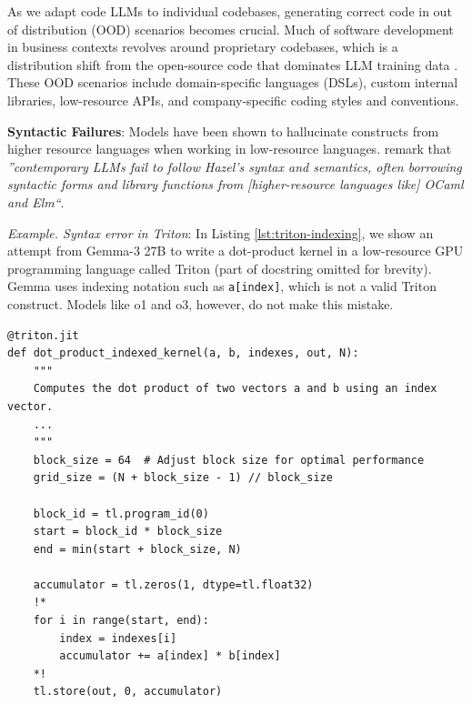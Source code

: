 
As we adapt code LLMs to individual codebases, generating correct code in out of distribution (OOD) scenarios becomes crucial. Much of software development in business contexts revolves around proprietary codebases, which is a distribution shift from the open-source code that dominates LLM training data  \citep{ahmed2024studying}. These OOD scenarios include domain-specific languages (DSLs), custom internal libraries, low-resource APIs, and company-specific coding styles and conventions.

\textbf{Syntactic Failures}: Models have been shown to hallucinate constructs from higher resource languages when working in low-resource languages. \citet{blinn2024statically} remark that \textit{''contemporary LLMs fail to follow Hazel’s syntax and semantics, often borrowing syntactic forms and library functions from [higher-resource languages like] OCaml and Elm``}. 

\begin{tcolorbox}[colback=lightblue, boxrule=0pt, arc=5pt, outer arc=5pt, after skip=10pt plus 2pt]

\textit{Example. Syntax error in Triton}: In Listing \ref{lst:triton-indexing}, we show an attempt from Gemma-3 27B to write a dot-product kernel in a low-resource GPU programming language called Triton (part of docstring omitted for brevity). Gemma uses indexing notation such as \texttt{a[index]}, which is not a valid Triton construct. Models like o1 and o3, however, do not make this mistake.

\begin{lstlisting}[label={lst:triton-indexing}, captionpos=t, breaklines=true, language=triton]
@triton.jit
def dot_product_indexed_kernel(a, b, indexes, out, N):
    """
    Computes the dot product of two vectors a and b using an index vector.
    ...
    """
    block_size = 64  # Adjust block size for optimal performance
    grid_size = (N + block_size - 1) // block_size

    block_id = tl.program_id(0)
    start = block_id * block_size
    end = min(start + block_size, N)

    accumulator = tl.zeros(1, dtype=tl.float32)
    !*
    for i in range(start, end):
        index = indexes[i]
        accumulator += a[index] * b[index]
    *!
    tl.store(out, 0, accumulator)
\end{lstlisting}
\end{tcolorbox}

